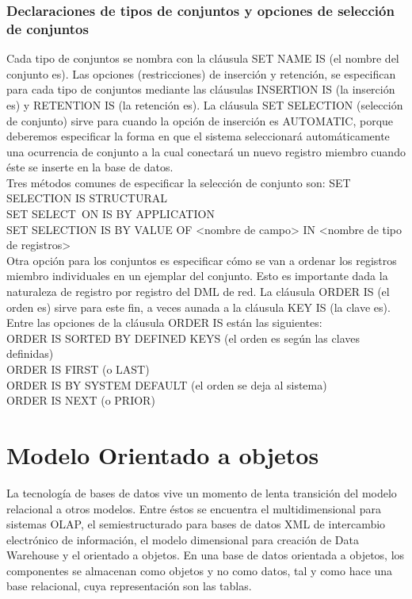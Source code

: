 \documentclass[12pts, A3 ,twosides]{article}
\begin{document}
\subsubsection{Declaraciones de tipos de conjuntos y opciones de selección de conjuntos}
Cada tipo de conjuntos se nombra con la cláusula SET NAME IS (el nombre del conjunto es).
Las opciones (restricciones) de inserción y retención, se especifican para cada tipo de conjuntos mediante las cláusulas INSERTlON IS (la inserción es) y RETENTlON IS (la retención es).
La cláusula SET SELECTION (selección de conjunto) sirve para cuando la opción de inserción es AUTOMATIC, porque deberemos especificar la forma en que el sistema seleccionará automáticamente una ocurrencia de conjunto a la cual conectará un nuevo registro miembro cuando éste se inserte en la base de datos.\\
Tres métodos comunes de especificar la selección de conjunto son:
SET SELECTION IS STRUCTURAL\\
SET SELECT~ON IS BY APPLICATION\\
SET SELECTION IS BY VALUE OF <nombre de campo> IN <nombre de tipo de registros>\\

Otra opción para los conjuntos es especificar cómo se van a ordenar los registros miembro individuales en un ejemplar del conjunto. Esto es importante dada la naturaleza de registro por registro del DML de red.
La cláusula ORDER IS (el orden es) sirve para este fin, a veces aunada a la cláusula KEY IS (la clave es). Entre las opciones de la cláusula ORDER IS están las siguientes:\\

ORDER IS SORTED BY DEFINED KEYS (el orden es según las claves definidas)\\
ORDER IS FIRST (o LAST)\\
ORDER IS BY SYSTEM DEFAULT (el orden se deja al sistema)\\
ORDER IS NEXT (o PRIOR)\\



\section{Modelo Orientado a objetos}
 La tecnología de bases de datos vive un momento de lenta transición del modelo relacional a otros modelos. Entre éstos se encuentra el multidimensional para sistemas OLAP, el semiestructurado para bases de datos XML de intercambio electrónico de información, el modelo dimensional para creación de Data Warehouse y el orientado a objetos. En una base de datos orientada a objetos, los componentes se almacenan como objetos y no como datos, tal y como hace una base relacional, cuya representación son las tablas.
\end{document}
